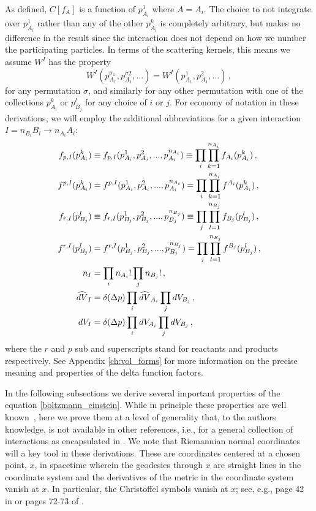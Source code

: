  As defined, $C[f_A]$ is a function of $p_{A_i}^1$ where $A=A_i$. The choice to not integrate over $p_{A_i}^1$ rather than any of the other $p_{A_i}^k$ is completely arbitrary, but makes no difference in the result since the interaction does not depend on how we number the participating particles. In terms of the scattering kernels, this means we assume $W^I$ has the property
\begin{equation}\label{reorder_property}
W^I(p_{A_1}^{\sigma_1},p^{\sigma 2}_{A_1},...)=W^I(p_{A_1}^1,p_{A_1}^2,...)\,,
\end{equation}
for any permutation $\sigma$, and similarly for any other permutation with one of the collections $p_{A_i}^k$ or $p_{B_j}^l$ for any choice of $i$ or $j$. For economy of notation in these derivations, we will employ the additional abbreviations for a given interaction  $I=n_{B_i}B_i\longrightarrow n_{A_i}A_i$:
\begin{align}
f_{p,I}(p^k_{A_i})&\equiv f_{p,I}(p^1_{A_i},p^2_{A_i},...,p^{n_{A_i}}_{A_i})\equiv \prod_i \prod_{k=1}^{n_{A_i}}f_{A_i}(p_{A_i}^k)\,,\\
f^{p,I}(p^k_{A_i})&=f^{p,I}(p^1_{A_i},p^2_{A_i},...,p^{n_{A_i}}_{A_i})=\prod_i \prod_{k=1}^{n_{A_i}}f^{A_i}(p_{A_i}^k)\,,\notag\\
f_{r,I}(p^l_{B_j})&\equiv f_{r,I}(p^1_{B_j},p^2_{B_j},...,p^{n_{B_j}}_{B_j})\equiv \prod_j \prod_{l=1}^{n_{B_j}}f_{B_j}(p_{B_j}^l)\,,\notag\\
f^{r,I}(p^l_{B_j})&=f^{r,I}(p^1_{B_j},p^2_{B_j},...,p^{n_{B_j}}_{B_j})=\prod_j \prod_{l=1}^{n_{B_j}}f^{B_j}(p_{B_j}^l)\,,\notag\\
n_I&=\prod_i n_{A_i}!\prod _j n_{B_j}!\,,\notag\\
\widehat{dV}_I&=\delta(\Delta p)\prod_i\widehat{dV}_{A_i}\prod_jdV_{B_j}\,,\notag\\
dV_I&=\delta(\Delta p)\prod_idV_{A_i}\prod_jdV_{B_j}\,,\notag
\end{align}
where the $r$ and $p$ sub and superscripts stand for reactants and products respectively.   See Appendix \ref{ch:vol_forms} for more information on the precise meaning and properties of the delta function factors.

In the following subsections we derive several important  properties of the equation \eqref{boltzmann_einstein}.  While in principle these properties are well known~\cite{Andreasson:2011ng,cercignani,Choquet-Bruhat:2009xil,ehlers}, here we prove them at a level of generality that, to the authors knowledge, is not available in other references, i.e., for a general collection of interactions as encapsulated in .  We  note that Riemannian normal coordinates will a key tool   in these derivations.   These are coordinates centered at a chosen point, $x$, in spacetime wherein the geodesics through $x$ are straight lines in the coordinate system and the derivatives of the metric in the coordinate system vanish at $x$. In particular, the Christoffel symbols vanish at $x$; see, e.g., page 42 in \cite{Wald:1984rg} or pages 72-73 of \cite{o1983semi}.  
